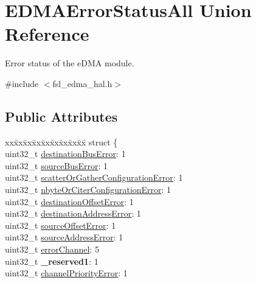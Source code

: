 \hypertarget{unionEDMAErrorStatusAll}{}\section{E\+D\+M\+A\+Error\+Status\+All Union Reference}
\label{unionEDMAErrorStatusAll}


Error status of the e\+D\+MA module.  




{\ttfamily \#include $<$fsl\+\_\+edma\+\_\+hal.\+h$>$}

\subsection*{Public Attributes}
\begin{DoxyCompactItemize}
\item 
\begin{tabbing}
xx\=xx\=xx\=xx\=xx\=xx\=xx\=xx\=xx\=\kill
struct \{\\
\>uint32\_t \hyperlink{unionEDMAErrorStatusAll_a6a765695f43c6c4526079f2485af3e8d}{destinationBusError}: 1\\
\>uint32\_t \hyperlink{unionEDMAErrorStatusAll_a8e44c7e3184403d0af77b40cd9c68ba1}{sourceBusError}: 1\\
\>uint32\_t \hyperlink{unionEDMAErrorStatusAll_a8435402d23dae1727f257e5241e15f31}{scatterOrGatherConfigurationError}: 1\\
\>uint32\_t \hyperlink{unionEDMAErrorStatusAll_aadf03605fe7361e9b20d659235ccfc3b}{nbyteOrCiterConfigurationError}: 1\\
\>uint32\_t \hyperlink{unionEDMAErrorStatusAll_a4128b548169ddf05b80cac1cc8961581}{destinationOffsetError}: 1\\
\>uint32\_t \hyperlink{unionEDMAErrorStatusAll_a79ae09640e957c306a648e5af0b8c906}{destinationAddressError}: 1\\
\>uint32\_t \hyperlink{unionEDMAErrorStatusAll_a82039eea24032f54e0c4ab85166480e3}{sourceOffsetError}: 1\\
\>uint32\_t \hyperlink{unionEDMAErrorStatusAll_ae403b5943b4d12038ecf885fb3a707fb}{sourceAddressError}: 1\\
\>uint32\_t \hyperlink{unionEDMAErrorStatusAll_aed7a2751b3f5c2bf107e374af098bf5d}{errorChannel}: 5\\
\>uint32\_t {\bfseries \_reserved1}: 1\\
\>uint32\_t \hyperlink{unionEDMAErrorStatusAll_a1bd481a8b76321d64d1f8459d7477dac}{channelPriorityError}: 1\\

\end{tabbing}
\end{DoxyCompactItemize}
